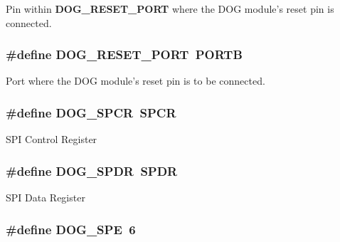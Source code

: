 Pin within {\bfseries D\-O\-G\-\_\-\-R\-E\-S\-E\-T\-\_\-\-P\-O\-R\-T} where the D\-O\-G module's reset pin is connected. \hypertarget{group___d_o_g_m128__user__configuration_gadcdcd4600395a1e3f2fb35ecb2b3d929}{
\subsubsection[{D\-O\-G\-\_\-\-R\-E\-S\-E\-T\-\_\-\-P\-O\-R\-T}]{\setlength{\rightskip}{0pt plus 5cm}\#define D\-O\-G\-\_\-\-R\-E\-S\-E\-T\-\_\-\-P\-O\-R\-T~P\-O\-R\-T\-B}}\label{group___d_o_g_m128__user__configuration_gadcdcd4600395a1e3f2fb35ecb2b3d929}
Port where the D\-O\-G module's reset pin is to be connected. \hypertarget{group___d_o_g_m128__user__configuration_ga62934fe8df286841d3c96eb0a0becea4}{
\subsubsection[{D\-O\-G\-\_\-\-S\-P\-C\-R}]{\setlength{\rightskip}{0pt plus 5cm}\#define D\-O\-G\-\_\-\-S\-P\-C\-R~S\-P\-C\-R}}\label{group___d_o_g_m128__user__configuration_ga62934fe8df286841d3c96eb0a0becea4}
S\-P\-I Control Register \hypertarget{group___d_o_g_m128__user__configuration_gaac040a40e5ddcb24b41b9b874c7e233d}{
\subsubsection[{D\-O\-G\-\_\-\-S\-P\-D\-R}]{\setlength{\rightskip}{0pt plus 5cm}\#define D\-O\-G\-\_\-\-S\-P\-D\-R~S\-P\-D\-R}}\label{group___d_o_g_m128__user__configuration_gaac040a40e5ddcb24b41b9b874c7e233d}
S\-P\-I Data Register \hypertarget{group___d_o_g_m128__user__configuration_ga97d060a772adc90a77ef22e1325b31d5}{
\subsubsection[{D\-O\-G\-\_\-\-S\-P\-E}]{\setlength{\rightskip}{0pt plus 5cm}\#define D\-O\-G\-\_\-\-S\-P\-E~6}}\label{group___d_o_g_m128__user__configuration_ga97d060a772adc90a77ef22e1325b31d5}
